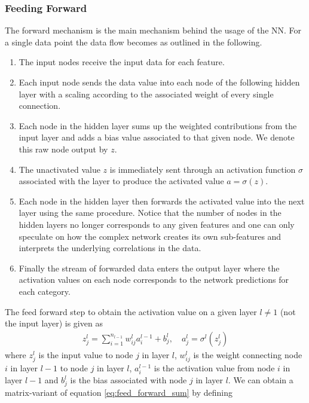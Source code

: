 \subsubsection{Feeding Forward} 
The forward mechanism is the main mechanism behind the usage of the \ac{NN}.
 For a single data point the data flow becomes as outlined in the following.
\begin{enumerate}
    \item The input nodes receive the input data for each feature. 
    \item Each input node sends the data value into each node of the following hidden layer with a scaling according to the associated weight of every single connection. 
    \item Each node in the hidden layer sums up the weighted contributions from the input layer and adds a bias value associated to that given node. We denote this raw node output by $z$.
    \item The unactivated value $z$ is immediately sent through an activation function $\sigma$ associated with the layer to produce the activated value $a = \sigma(z)$.
    \item Each node in the hidden layer then forwards the activated value into the next layer using the same procedure. Notice that the number of nodes in the hidden layers no longer corresponds to any given features and one can only speculate on how the complex network creates its own sub-features and interprets the underlying correlations in the data. 
    \item Finally the stream of forwarded data enters the output layer where the activation values on each node corresponds to the network predictions for each category. 
\end{enumerate}
The feed forward step to obtain the activation value on a given layer $l\ne 1$ (not the input layer) is given as
\begin{align}
    z_j^l = \sum_{i = 1}^{n_{l-1}} w_{ij}^l a_i^{l-1} + b_j^l, \quad a_j^l = \sigma^l(z_j^l)
    \label{eq:feed_forward_sum}
\end{align}
where $z_j^l$ is the input value to node $j$ in layer $l$, $w_{ij}^l$ is the weight connecting node $i$ in layer $l-1$ to node $j$ in layer $l$, $a_i^{l-1}$ is the activation value from node $i$ in layer $l-1$ and $b_j^l$ is the bias associated with node $j$ in layer $l$. We can obtain a matrix-variant of equation \ref{eq:feed_forward_sum} by defining
